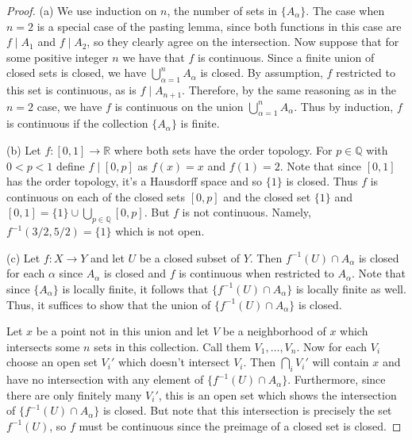 \documentclass{article}
\begin{document}
\begin{proof}
(a) We use induction on $n$, the number of sets in $\{A_{\alpha}\}$. The case when $n = 2$ is a special case of the pasting lemma, since both functions in this case are $f \mid A_{1}$ and $f \mid A_{2}$, so they clearly agree on the intersection. Now suppose that for some positive integer $n$ we have that $f$ is continuous. Since a finite union of closed sets is closed, we have $\bigcup_{\alpha=1}^{n} A_{\alpha}$ is closed. By assumption, $f$ restricted to this set is continuous, as is $f \mid A_{n+1}$. Therefore, by the same reasoning as in the $n = 2$ case, we have $f$ is continuous on the union $\bigcup_{\alpha=1}^{n} A_{\alpha}$. Thus by induction, $f$ is continuous if the collection $\{A_{\alpha}\}$ is finite.

(b) Let $f : [0,1] \to \mathbb{R}$ where both sets have the order topology. For $p \in \mathbb{Q}$ with $0 < p < 1$ define $f \mid [0,p]$ as $f(x) = x$ and $f(1) = 2$. Note that since $[0,1]$ has the order topology, it's a Hausdorff space and so $\{1\}$ is closed. Thus $f$ is continuous on each of the closed sets $[0,p]$ and the closed set $\{1\}$ and $[0,1] = \{1\} \cup \bigcup_{p \in \mathbb{Q}} [0,p]$. But $f$ is not continuous. Namely, $f^{-1}(3/2,5/2) = \{1\}$ which is not open.

(c) Let $f : X \to Y$ and let $U$ be a closed subset of $Y$. Then $f^{-1}(U) \cap A_{\alpha}$ is closed for each $\alpha$ since $A_{\alpha}$ is closed and $f$ is continuous when restricted to $A_{\alpha}$. Note that since $\{A_{\alpha}\}$ is locally finite, it follows that $\{f^{-1}(U) \cap A_{\alpha}\}$ is locally finite as well. Thus, it suffices to show that the union of $\{f^{-1}(U) \cap A_{\alpha}\}$ is closed.

Let $x$ be a point not in this union and let $V$ be a neighborhood of $x$ which intersects some $n$ sets in this collection. Call them $V_1, \dots , V_n$. Now for each $V_i$ choose an open set $V_i'$ which doesn't intersect $V_i$. Then $\bigcap_i V_i'$ will contain $x$ and have no intersection with any element of $\{f^{-1}(U) \cap A_{\alpha}\}$. Furthermore, since there are only finitely many $V_i'$, this is an open set which shows the intersection of $\{f^{-1}(U) \cap A_{\alpha}\}$ is closed. But note that this intersection is precisely the set $f^{-1}(U)$, so $f$ must be continuous since the preimage of a closed set is closed.
\end{proof}
\end{document}
